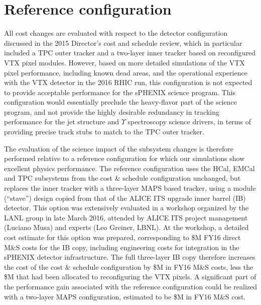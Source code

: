 \section{Reference configuration}

All cost changes are evaluated with respect to the detector
configuration discussed in the 2015 Director's cost and schedule
review, which in particular included a TPC outer tracker and a
two-layer inner tracker based on reconfigured VTX pixel
modules. However, based on more detailed simulations of the VTX pixel
performance, including known dead areas, and the operational
experience with the VTX detector in the 2016 RHIC run, this
configuration is not expected to provide acceptable performance for
the sPHENIX science program. This configuration would essentially
preclude the heavy-flavor part of the science program, and not provide
the highly desirable redundancy in tracking performance for the jet
structure and $\Upsilon$ spectroscopy science drivers, in terms of
providing precise track stubs to match to the TPC outer tracker.

The evaluation of the science impact of the subsystem changes is
therefore performed relative to a reference configuration for which
our simulations show excellent physics performance. The reference
configuration uses the HCal, EMCal and TPC subsystems from the cost \&
schedule configuration unchanged, but replaces the inner tracker with
a three-layer MAPS based tracker, using a module (``stave'') design
copied from that of the ALICE ITS upgrade inner barrel (IB)
detector. This option was extensively evaluated in a workshop
organized by the LANL group in late March 2016, attended by ALICE ITS
project management (Luciano Musa) and experts (Leo Greiner, LBNL).  At
the workshop, a detailed cost estimate for this option was prepared,
corresponding to \${\threeLayerMAPS}M FY16 direct M\&S costs for the
IB copy, including engineering costs for integration in the sPHENIX
detector infrastructure.  The full three-layer IB copy therefore
increases the cost of the cost \& schedule configuration by
\${\threeLayerMAPS}M in FY16 M\&S costs, less the \${\noVTX}M that had
been allocated to reconfiguring the VTX pixels. A significant part of
the performance gain associated with the reference configuration could
be realized with a two-layer MAPS configuration, estimated to be
\${\twoLayerMAPS}M in FY16 M\&S cost.

